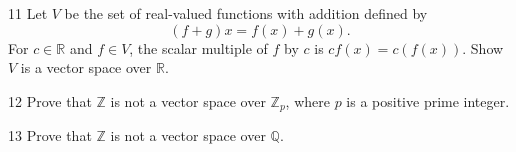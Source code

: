 \begin{problem}{11}
    Let $V$ be the set of real-valued functions with addition defined by
    \[(f + g)x = f(x) + g(x).\]
    For $c \in \mathbb{R}$ and $f \in V$, the scalar multiple of $f$ by $c$ is
    $cf(x) = c(f(x))$. Show $V$ is a vector space over $\mathbb{R}$.
\end{problem}
\unsolved

\begin{problem}{12}
    Prove that $\mathbb{Z}$ is not a vector space over $\mathbb{Z}_p$, where $p$ is a
    positive prime integer.
\end{problem}
\unsolved

\begin{problem}{13}
    Prove that $\mathbb{Z}$ is not a vector space over $\mathbb{Q}$.
\end{problem}
\unsolved
